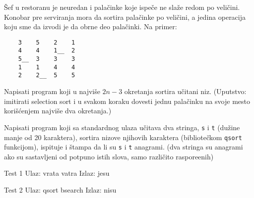 \begin{Exercise}[label=512]
  \v Sef u restoranu je neuredan i pala\v cinke koje ispe\v ce
  ne sla\v ze redom po veli\v cini. Konobar pre serviranja mora da
  sortira pala\v cinke po veli\v cini, a jedina operacija koju sme
  da izvodi je da obrne deo pala\v cinki. Na primer:
\begin{verbatim}
    3    5    2    1
    4    4    1__  2
    5__  3    3    3
    1    1    4    4
    2    2__  5    5
\end{verbatim}
Napisati program koji u najvi\v se $2n-3$ okretanja sortira u\v
citani niz. (Uputstvo: imitirati selection sort i u svakom koraku
dovesti jednu pala\v cinku na svoje mesto kori\v s\' cenjem
najvi\v se dva okretanja.)
    
\end{Exercise}

\begin{Exercise}[label=513]
  Napisati program koji sa standardnog ulaza u\v citava dva
  stringa, \verb|s| i \verb|t| (du\v zine manje od 20 karaktera),
  sortira nizove njihovih karaktera (bibliote\v ckom \verb|qsort|
  funkcijom), ispituje i \v stampa da li su \verb|s| i \verb|t|
  anagrami. (dva stringa su anagrami ako su sastavljeni od potpuno
  istih slova, samo razli\v cito raspore\dj enih)
  
  \begin{miditest}
    \begin{test}{Test 1}
Ulaz:   vrata vatra
Izlaz:  jesu
    \end{test}
  \end{miditest}
  \begin{miditest}
    \begin{test}{Test 2}
Ulaz:   qsort bsearch
Izlaz:  nisu
    \end{test}
  \end{miditest}
  
\end{Exercise}

